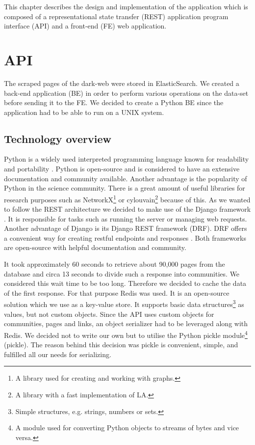 This chapter describes the design and implementation of the application which is composed of a representational state transfer (REST) application program interface (API) and a front-end (FE) web application. 

\section{API}
The scraped pages of the dark-web were stored in ElasticSearch. We created a back-end application (BE) in order to perform various operations on the data-set before sending it to the FE. We decided to create a Python BE since the application had to be able to run on a UNIX system. 
\subsection{Technology overview}
Python is a widely used interpreted programming language known for readability and portability \cite{aboutPython}. Python is open-source and is considered to have an extensive documentation and community available. Another advantage is the popularity of Python in the science community. There is a great amount of useful libraries for research purposes such as NetworkX\footnote{A library used for creating and working with graphs.} \cite{networkX} or cylouvain\footnote{A library with a fast implementation of LA.} \cite{cylouvain} because of this.  
As we wanted to follow the REST architecture we decided to make use of the Django framework \cite{meetDjango}. It is responsible for tasks such as running the server or managing web requests. Another advantage of Django is its Django REST framework (DRF). DRF offers a convenient way for creating restful endpoints and responses \cite{djangoRest}. Both frameworks are open-source with helpful documentation and community. 

It took approximately 60 seconds to retrieve about 90,000 pages from the database and circa 13 seconds to divide such a response into communities. We considered this wait time to be too long. Therefore we decided to cache the data of the first response. For that purpose Redis \cite{redis} was used. It is an open-source solution which we use as a key-value store. It supports  basic data structures\footnote{Simple structures, e.g. strings, numbers or sets.} as values, but not custom objects. Since the API uses custom objects for communities, pages and links, an object serializer had to be leveraged along with Redis. We decided not to write our own but to utilise the Python pickle module\footnote{A module used for converting Python objects to streams of bytes and vice versa.} \cite{pickle} (pickle). The reason behind this decision was pickle is convenient, simple, and fulfilled all our needs for serializing.

